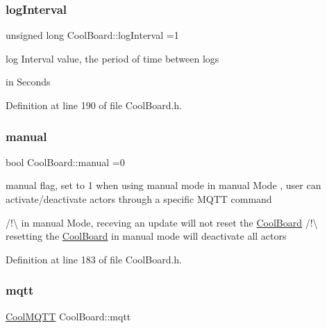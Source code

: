 \mbox{\label{class_cool_board_a84bc94413b64973e4aba8c467c97006c}} 
\subsubsection{\texorpdfstring{log\+Interval}{logInterval}}
{\footnotesize\ttfamily unsigned long Cool\+Board\+::log\+Interval =1\hspace{0.3cm}{\ttfamily [private]}}

log Interval value, the period of time between logs
\begin{DoxyItemize}
\item in Seconds 
\end{DoxyItemize}

Definition at line 190 of file Cool\+Board.\+h.

\mbox{\label{class_cool_board_a7c8e505a5804b109e112d5a03df6ea2b}} 
\subsubsection{\texorpdfstring{manual}{manual}}
{\footnotesize\ttfamily bool Cool\+Board\+::manual =0\hspace{0.3cm}{\ttfamily [private]}}

manual flag, set to 1 when using manual mode in manual Mode , user can activate/deactivate actors through a specific M\+Q\+TT command

/!\textbackslash{} in manual Mode, receving an update will not reset the \hyperlink{class_cool_board}{Cool\+Board} /!\textbackslash{} resetting the \hyperlink{class_cool_board}{Cool\+Board} in manual mode will deactivate all actors 

Definition at line 183 of file Cool\+Board.\+h.

\mbox{\label{class_cool_board_a2399f44d7c23c1149a335cb3b46d90f1}} 
\subsubsection{\texorpdfstring{mqtt}{mqtt}}
{\footnotesize\ttfamily \hyperlink{class_cool_m_q_t_t}{Cool\+M\+Q\+TT} Cool\+Board\+::mqtt\hspace{0.3cm}{\ttfamily [private]}}

